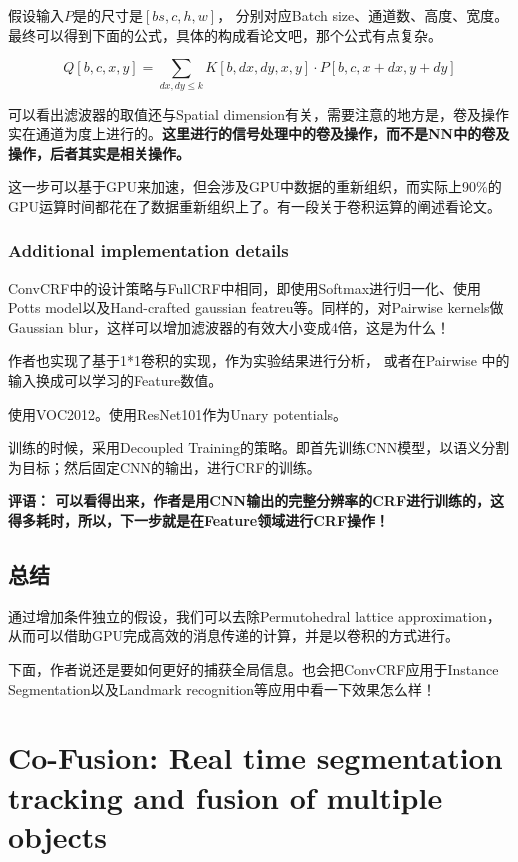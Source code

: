 假设输入$P$是的尺寸是$[bs, c, h, w]$， 分别对应Batch size、通道数、高度、宽度。最终可以得到下面的公式，具体的构成看论文吧，那个公式有点复杂。

\begin{displaymath}
Q[b, c, x, y] = \sum_{dx, dy \le k} K[b, dx, dy, x, y] \cdot P[b, c, x+dx, y+dy]
\end{displaymath}

可以看出滤波器的取值还与Spatial dimension有关，需要注意的地方是，卷及操作实在通道为度上进行的。{\bfseries 这里进行的信号处理中的卷及操作，而不是NN中的卷及操作，后者其实是相关操作。}

这一步可以基于GPU来加速，但会涉及GPU中数据的重新组织，而实际上90\%的GPU运算时间都花在了数据重新组织上了。有一段关于卷积运算的阐述看论文。

\subsubsection{Additional implementation details}

ConvCRF中的设计策略与FullCRF中相同，即使用Softmax进行归一化、使用Potts model以及Hand-crafted gaussian featreu等。同样的，对Pairwise kernels做Gaussian blur，这样可以增加滤波器的有效大小变成4倍，这是为什么！

作者也实现了基于1*1卷积的实现，作为实验结果进行分析， 或者在Pairwise 中的输入换成可以学习的Feature数值。

使用VOC2012。使用ResNet101作为Unary potentials。

训练的时候，采用Decoupled Training的策略。即首先训练CNN模型，以语义分割为目标；然后固定CNN的输出，进行CRF的训练。

{\color{red} \bfseries 评语： 可以看得出来，作者是用CNN输出的完整分辨率的CRF进行训练的，这得多耗时，所以，下一步就是在Feature领域进行CRF操作！}


\subsection{总结}

通过增加条件独立的假设，我们可以去除Permutohedral lattice approximation，从而可以借助GPU完成高效的消息传递的计算，并是以卷积的方式进行。

下面，作者说还是要如何更好的捕获全局信息。也会把ConvCRF应用于Instance Segmentation以及Landmark recognition等应用中看一下效果怎么样！




\section[Co-Fusion]{Co-Fusion: Real time segmentation tracking and fusion of multiple objects}

